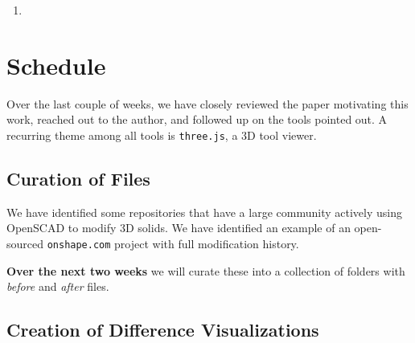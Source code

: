 \documentclass[sigconf,authorversion,nonacm]{acmart}
\begin{document}
\begin{enumerate}
\begin{description}
	      \end{description}
	\item
\end{enumerate}

\section{Schedule}

Over the last couple of weeks, we have closely reviewed the paper motivating this work, reached out to the author, and followed up on the tools pointed out. A recurring theme among all tools is \texttt{three.js}, a 3D tool viewer.


\subsection{Curation of Files}

We have identified some repositories that have a large community actively using OpenSCAD to modify 3D solids. We have identified an example of an open-sourced \texttt{onshape.com} project with full modification history.

\textbf{Over the next two weeks} we will curate these into a collection of folders with \emph{before} and \emph{after} files.

\subsection{Creation of Difference Visualizations}
\end{document}
